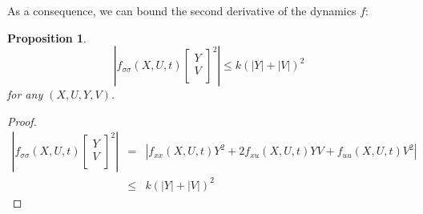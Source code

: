 \documentclass[a4paper,10pt]{article}
\newtheorem{proposition}{Proposition}
\begin{document}
As a consequence, we can bound the second derivative of the dynamics 
$f$:
\begin{proposition}
\begin{equation}
        \left|f_{\sigma \sigma}(X,U,t)\left[
        \begin{array}
        {c}
            
            Y  \\
            
            V  \\
            
             
        \end{array}
        \right]^{2}\right| \leq k(|Y|+|V|)^{2}
    \label{fsigmasigma}
\end{equation}
for any $(X,U,Y,V)$.
\end{proposition}
\begin{proof}
\begin{eqnarray*}
     \left|f_{\sigma \sigma}(X,U,t)\left[
        \begin{array}
        {c}
            
            Y  \\
            
            V  \\
            
             
        \end{array}
        \right]^{2}\right| &
	= &  |f_{xx}(X,U,t)Y^{2}  
	         + 2f_{xu}(X,U,t)YV + f_{uu}(X,U,t)V^{2}| \\
     & \leq & k(|Y|+|V|)^{2}
\end{eqnarray*}    
\end{proof}
\end{document}

